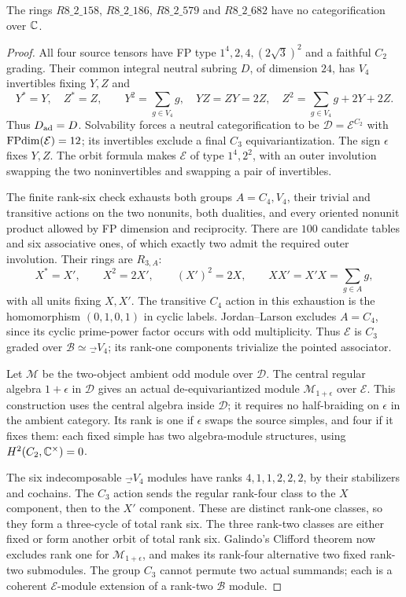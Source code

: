 \begin{proposition}\label{prop:dimension48}
The rings $R8\_2\_158$, $R8\_2\_186$, $R8\_2\_579$ and
$R8\_2\_682$ have no categorification over $\mathbb C$.
\end{proposition}
\nopagebreak[4]
\begin{proof}
All four source tensors have FP type $1^4,2,4,(2\sqrt3)^2$ and a
faithful $C_2$ grading. Their common integral neutral subring $D$,
of dimension $24$, has $V_4$ invertibles fixing $Y,Z$ and
\[
Y^*=Y,\quad Z^*=Z,\qquad Y^2=\sum_{g\in V_4}g,
\quad YZ=ZY=2Z,\quad Z^2=\sum_{g\in V_4}g+2Y+2Z.
\]
Thus $D_{\rm ad}=D$. Solvability \cite[Theorem~1.6]{ENOSolvable}
forces a neutral categorification to be
$\mathcal D=\mathcal E^{C_2}$ with $\operatorname{FPdim}(\mathcal E)=12$;
its invertibles exclude a final $C_3$ equivariantization.
The sign $\epsilon$ fixes $Y,Z$. The orbit formula makes
$\mathcal E$ of type $1^4,2^2$, with an outer involution swapping
the two noninvertibles and swapping a pair of invertibles.

The finite rank-six check exhausts both groups $A=C_4,V_4$, their
trivial and transitive actions on the two nonunits, both dualities,
and every oriented nonunit product allowed by FP dimension and
reciprocity. There are $100$ candidate tables and six associative
ones, of which exactly two admit the required outer involution.
Their rings are $R_{3,A}$:
\[
X^*=X',\qquad X^2=2X',\qquad (X')^2=2X,\qquad
XX'=X'X=\sum_{g\in A}g,
\]
with all units fixing $X,X'$. The transitive $C_4$ action in this
exhaustion is the homomorphism $(0,1,0,1)$ in cyclic labels.
Jordan--Larson \cite[Theorem~1.4]{JordanLarson} excludes $A=C_4$,
since its cyclic prime-power factor occurs with odd multiplicity.
Thus $\mathcal E$ is $C_3$ graded over
$\mathcal B\simeq\Vec_{V_4}$; its rank-one components trivialize
the pointed associator.

Let $\mathcal M$ be the two-object ambient odd module over
$\mathcal D$. The central regular algebra $1+\epsilon$ in
$\mathcal D$ gives an actual de-equivariantized module
$\mathcal M_{1+\epsilon}$ over $\mathcal E$.
This construction uses the central algebra inside $\mathcal D$;
it requires no half-braiding on $\epsilon$ in the ambient category.
Its rank is one if $\epsilon$ swaps the source simples, and four
if it fixes them: each fixed simple has two algebra-module structures,
using $H^2(C_2,\mathbb C^\times)=0$.

The six indecomposable $\Vec_{V_4}$ modules have ranks
$4,1,1,2,2,2$, by their stabilizers and cochains.
The $C_3$ action sends the regular rank-four class to the $X$
component, then to the $X'$ component. These are distinct rank-one
classes, so they form a three-cycle of total rank six. The three
rank-two classes are either fixed or form another orbit of total
rank six. Galindo's Clifford theorem
\cite[Proposition~4.1 and Theorem~1.1]{GalindoClifford} now excludes
rank one for $\mathcal M_{1+\epsilon}$, and makes its rank-four
alternative two fixed rank-two submodules. The group $C_3$ cannot
permute two actual summands; each is a coherent $\mathcal E$-module
extension of a rank-two $\mathcal B$ module.


\end{proof}
